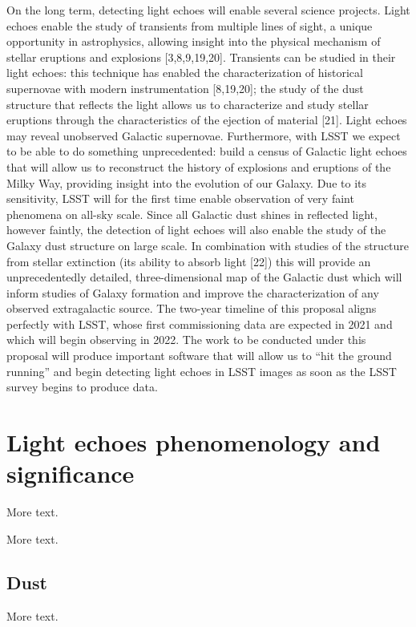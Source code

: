 \documentclass{proposalnsf}
\begin{document}
On the long term, detecting light echoes will enable several science projects.  Light echoes enable the study of transients from multiple lines of sight, a unique opportunity in astrophysics, allowing insight into the physical mechanism of stellar eruptions and explosions [3,8,9,19,20].  Transients can be studied in their light echoes: this technique has enabled the characterization of historical supernovae with modern instrumentation [8,19,20]; the study of the dust structure that reflects the light allows us to characterize and study stellar eruptions through the characteristics of the ejection of material [21].  Light echoes may reveal unobserved Galactic supernovae.  Furthermore, with LSST we expect to be able to do something unprecedented: build a census of Galactic light echoes that will allow us to reconstruct the history of explosions and eruptions of the Milky Way, providing insight into the evolution of our Galaxy.  Due to its sensitivity, LSST will for the first time enable observation of very faint phenomena on all-sky scale.  Since all Galactic dust shines in reflected light, however faintly, the detection of light echoes will also enable the study of the Galaxy dust structure on large scale.  In combination with studies of the structure from stellar extinction (its ability to absorb light [22]) this will provide an unprecedentedly detailed, three-dimensional map of the Galactic dust which will inform studies of Galaxy formation and improve the characterization of any observed extragalactic source. 
The two-year timeline of this proposal aligns perfectly with LSST, whose  first commissioning data are expected in 2021 and which will begin observing in 2022.  The work to be conducted under this proposal will produce important software that will allow us to “hit the ground running” and begin detecting light echoes in LSST images as soon as the LSST survey begins to produce data. 

\section{Light echoes phenomenology and significance}

More text.


More text.
\subsection{Dust}

More text.
\end{document}

